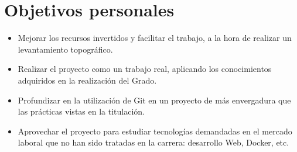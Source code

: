 \section{Objetivos personales}
\begin{itemize}
\item Mejorar los recursos invertidos y facilitar el trabajo, a la hora de realizar un levantamiento topográfico.

\item Realizar el proyecto como un trabajo real, aplicando los conocimientos adquiridos en la realización del Grado.
\item Profundizar en la utilización de Git en un proyecto de más envergadura que las prácticas vistas en la titulación.
\item Aprovechar el proyecto para estudiar tecnologías demandadas en el mercado laboral que no han sido tratadas en la carrera: desarrollo Web, Docker, etc.
\end{itemize}
